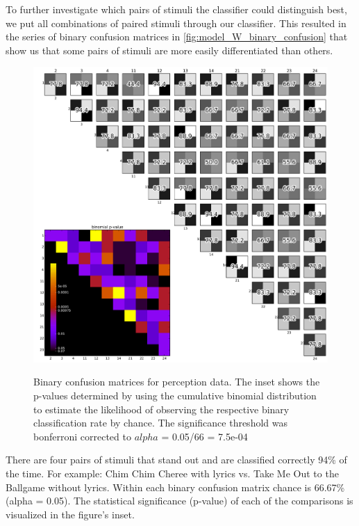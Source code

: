 To further investigate which pairs of stimuli the classifier could distinguish best, we put all combinations of paired stimuli through our classifier.
This resulted in the series of binary confusion matrices in \autoref{fig:model_W_binary_confusion} that show us that some pairs of stimuli are more easily differentiated than others. 
\begin{figure}[htb] 
  \begin{center}
    \includegraphics[width=.8\textwidth,keepaspectratio=true]{Figures/model_W_binary_confusion}
   \\\vspace{-0.8em}
    \caption{Binary confusion matrices for perception data.
    The inset shows the p-values determined by using the cumulative binomial distribution to estimate the likelihood of observing the respective binary classification rate by chance. The significance threshold was bonferroni corrected to $alpha$ =  0.05/66 = 7.5e-04}
    \label{fig:model_W_binary_confusion}
  \end{center}
  \vspace{-1em}
\end{figure}
There are four pairs of stimuli that stand out and are classified correctly 94\% of the time.
For example: Chim Chim Cheree with lyrics vs. Take Me Out to the Ballgame without lyrics. 
Within each binary confusion matrix chance is 66.67\% (alpha = 0.05).
The statistical significance (p-value) of each of the comparisons is visualized in the figure's inset. 

